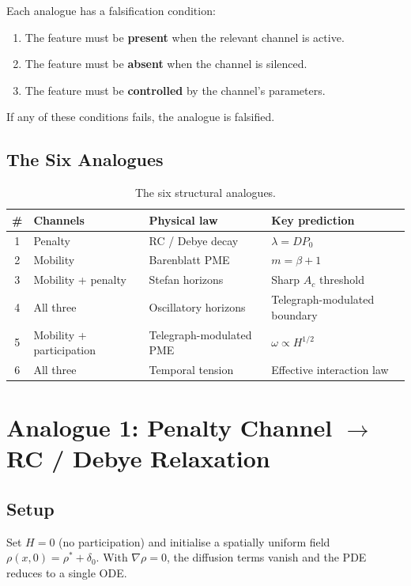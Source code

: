 \documentclass[11pt]{article}
\begin{document}
Each analogue has a falsification condition:
\begin{enumerate}
  \item The feature must be \textbf{present} when the relevant channel is active.
  \item The feature must be \textbf{absent} when the channel is silenced.
  \item The feature must be \textbf{controlled} by the channel's parameters.
\end{enumerate}
If any of these conditions fails, the analogue is falsified.

\subsection{The Six Analogues}

\begin{table}[h]
\centering
\begin{tabular}{@{}clll@{}}
\toprule
\# & Channels & Physical law & Key prediction \\
\midrule
1 & Penalty & RC / Debye decay & \(\lambda = DP_0\) \\
2 & Mobility & Barenblatt PME & \(m = \beta + 1\) \\
3 & Mobility + penalty & Stefan horizons & Sharp \(A_c\) threshold \\
4 & All three & Oscillatory horizons & Telegraph-modulated boundary \\
5 & Mobility + participation & Telegraph-modulated PME & \(\omega \propto H^{1/2}\) \\
6 & All three & Temporal tension & Effective interaction law \\
\bottomrule
\end{tabular}
\caption{The six structural analogues.}
\label{tab:analogues}
\end{table}

\section{Analogue 1: Penalty Channel \texorpdfstring{$\to$}{->} RC / Debye Relaxation}

\subsection{Setup}

Set \(H = 0\) (no participation) and initialise a spatially uniform field \(\rho(x,0) = \rho^* + \delta_0\). With \(\nabla\rho = 0\), the diffusion terms vanish and the PDE reduces to a single ODE.
\end{document}
